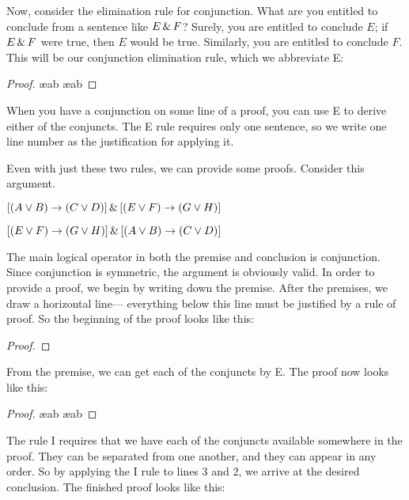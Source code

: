 Now, consider the elimination rule for conjunction. What are you entitled to conclude from a sentence like $E \,\&\, F$? Surely, you are entitled to conclude $E$; if $E \,\&\, F$ were true, then $E$ would be true. Similarly, you are entitled to conclude $F$. This will be our conjunction elimination rule, which we abbreviate {\eand}E:

\begin{proof}
	 \ae{ab}
	 \ae{ab}
\end{proof}

When you have a conjunction on some line of a proof, you can use {\eand}E to derive either of the conjuncts. The {\eand}E rule requires only one sentence, so we write one line number as the justification for applying it.

Even with just these two rules, we can provide some proofs. Consider this argument.
\begin{earg}
\item[] $[(A\vee B)\rightarrow(C\vee D)] \,\&\, [(E \vee F) \rightarrow (G\vee H)]$
\item[\therefore] $[(E \vee F) \rightarrow (G\vee H)] \,\&\, [(A\vee B)\rightarrow(C\vee D)]$
\end{earg}
The main logical operator in both the premise and conclusion is conjunction. Since conjunction is symmetric, the argument is obviously valid. In order to provide a proof, we begin by writing down the premise. After the premises, we draw a horizontal line--- everything below this line must be justified by a rule of proof. So the beginning of the proof looks like this:

\begin{proof}
\end{proof}

From the premise, we can get each of the conjuncts by {\eand}E. The proof now looks like this:

\begin{proof}
	 \ae{ab}
	 \ae{ab}
\end{proof}

The rule {\eand}I requires that we have each of the conjuncts available somewhere in the proof. They can be separated from one another, and they can appear in any order. So by applying the {\eand}I rule to lines 3 and 2, we arrive at the desired conclusion. The finished proof looks like this:

